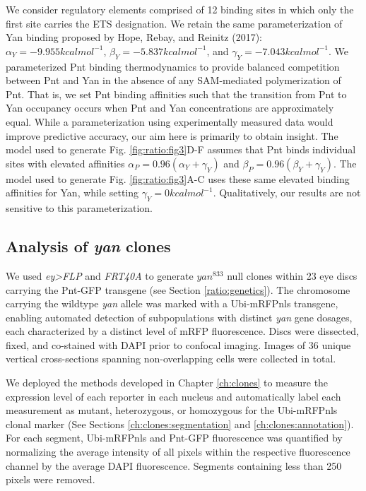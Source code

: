 We consider regulatory elements comprised of 12 binding sites in which only the first site carries the ETS designation. We retain the same parameterization of Yan binding proposed by Hope, Rebay, and Reinitz (2017): $\alpha_Y = -9.955 kcal mol^{-1}$, $\beta_Y = -5.837 kcal mol^{-1}$, and $\gamma_Y = -7.043 kcal mol^{-1}$. We parameterized Pnt binding thermodynamics to provide balanced competition between Pnt and Yan in the absence of any SAM-mediated polymerization of Pnt. That is, we set Pnt binding affinities such that the transition from Pnt to Yan occupancy occurs when Pnt and Yan concentrations are approximately equal. While a parameterization using experimentally measured data would improve predictive accuracy, our aim here is primarily to obtain insight. The model used to generate Fig. \ref{fig:ratio:fig3}D-F assumes that Pnt binds individual sites with elevated affinities $\alpha_P = 0.96 (\alpha_Y + \gamma_Y )$ and $\beta_P = 0.96 (\beta_Y + \gamma_Y )$. The model used to generate Fig. \ref{fig:ratio:fig3}A-C uses these same elevated binding affinities for Yan, while setting $\gamma_Y = 0 kcal mol^{-1}$. Qualitatively, our results are not sensitive to this parameterization. 

\subsection{Analysis of \textit{yan} clones}
\label{appendix:methods:ratio:clones}

We used \textit{ey>FLP} and \textit{FRT40A} to generate $yan^{833}$ null clones within 23 eye discs carrying the Pnt-GFP transgene (see Section \ref{ratio:genetics}). The chromosome carrying the wildtype \textit{yan} allele was marked with a Ubi-mRFPnls transgene, enabling automated detection of subpopulations with distinct \textit{yan} gene dosages, each characterized by a distinct level of mRFP fluorescence. Discs were dissected, fixed, and co-stained with DAPI prior to confocal imaging. Images of 36 unique vertical cross-sections spanning non-overlapping cells were collected in total. 

We deployed the methods developed in Chapter \ref{ch:clones} to measure the expression level of each reporter in each nucleus and automatically label each measurement as mutant, heterozygous, or homozygous for the Ubi-mRFPnls clonal marker (See Sections \ref{ch:clones:segmentation} and \ref{ch:clones:annotation}). For each segment, Ubi-mRFPnls and Pnt-GFP fluorescence was quantified by normalizing the average intensity of all pixels within the respective fluorescence channel by the average DAPI fluorescence. Segments containing less than 250 pixels were removed. 

